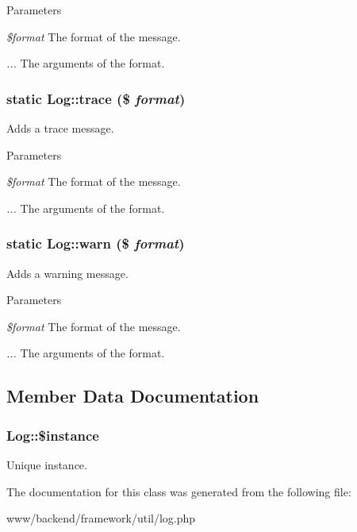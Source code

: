 \begin{DoxyParams}{Parameters}
\item[{\em \$format}]The format of the message. \item[{\em ...}]The arguments of the format. \end{DoxyParams}
\hypertarget{classLog_acc7be3022ea0ea09cc35eca4fd05ebb6}{
\subsubsection[{trace}]{\setlength{\rightskip}{0pt plus 5cm}static Log::trace (\$ {\em format})}}
\label{classLog_acc7be3022ea0ea09cc35eca4fd05ebb6}
Adds a trace message.


\begin{DoxyParams}{Parameters}
\item[{\em \$format}]The format of the message. \item[{\em ...}]The arguments of the format. \end{DoxyParams}
\hypertarget{classLog_a3dae74a7d221b316861c88726d07c65a}{
\subsubsection[{warn}]{\setlength{\rightskip}{0pt plus 5cm}static Log::warn (\$ {\em format})}}
\label{classLog_a3dae74a7d221b316861c88726d07c65a}
Adds a warning message.


\begin{DoxyParams}{Parameters}
\item[{\em \$format}]The format of the message. \item[{\em ...}]The arguments of the format. \end{DoxyParams}


\subsection{Member Data Documentation}
\hypertarget{classLog_af469fce19eb78a62dce34d2925348d53}{
\subsubsection[{\$instance}]{\setlength{\rightskip}{0pt plus 5cm}Log::\$instance}}
\label{classLog_af469fce19eb78a62dce34d2925348d53}
Unique instance. 

The documentation for this class was generated from the following file:\begin{DoxyCompactItemize}
\item 
www/backend/framework/util/log.php\end{DoxyCompactItemize}
